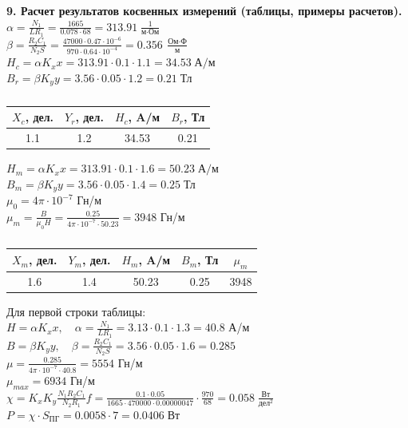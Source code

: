\documentclass[12pt,fleqn]{article}
\begin{document}
\begin{justify}
    \textbf{9. Расчет результатов косвенных измерений (таблицы, примеры расчетов).} \\
    $ \alpha = \frac{N_1}{LR_1} = \frac{1665}{0.078 \cdot 68} = 313.91 \; \frac{1}{\text{м} \cdot \text{Ом}} $ \\
    $ \beta = \frac{R_2C_1}{N_2S} = \frac{47000 \cdot 0.47 \cdot 10^{-6}}{970 \cdot 0.64 \cdot 10^{-4}} = 0.356 \; \frac{\text{Ом} \cdot \text{Ф}}{\text{м}} $ \\
    $ H_c = \alpha K_x x = 313.91 \cdot 0.1 \cdot 1.1 = 34.53 \; \text{А/м}$ \\
    $ B_r = \beta K_y y = 3.56 \cdot 0.05 \cdot 1.2 = 0.21 \; \text{Тл} $ \\
    \begin{table}[h]
    \centering
    \caption{}
    \renewcommand{\arraystretch}{1.5}
    \begin{tabular}{|c|c|c|c|}
        \hline
        $X_c$, дел. & $Y_r$, дел. & $H_c$, A/м & $B_r$, Тл \\
        \hline
        1.1 & 1.2 & 34.53 & 0.21 \\
        \hline
    \end{tabular}
    \end{table}
    $ H_m = \alpha K_x x = 313.91 \cdot 0.1 \cdot 1.6 = 50.23 \; \text{А/м}$ \\
    $ B_m = \beta K_y y = 3.56 \cdot 0.05 \cdot 1.4 = 0.25 \; \text{Тл} $ \\
    $ \mu_0 = 4\pi \cdot 10^{-7}$ Гн/м\\
    $ \mu_m = \frac{B}{\mu_0 H} = \frac{0.25}{4\pi \cdot 10^{-7} \cdot 50.23} = 3948 $ Гн/м \\
    \begin{table}[h]
    \centering
    \caption{}
    \renewcommand{\arraystretch}{1.5}
    \begin{tabular}{|c|c|c|c|c|}
        \hline
        $X_m$, дел. & $Y_m$, дел. & $H_m$, A/м & $B_m$, Тл & $ \mu_m $  \\
        \hline
        1.6 & 1.4 & 50.23 & 0.25 & 3948 \\
        \hline
    \end{tabular}
    \end{table}

    Для первой строки таблицы: \\
    $ H = \alpha K_x x, \quad \alpha = \frac{N_1}{L R_1} = 3.13 \cdot 0.1 \cdot 1.3 = 40.8 $ А/м\\
    $ B = \beta K_y y, \quad \beta = \frac{R_2 C_1}{N_2 S} = 3.56 \cdot 0.05 \cdot 1.6 = 0.285 $ \\
    $ \mu = \frac{0.285}{4\pi \cdot 10^{-7} \cdot 40.8} = 5554 $ Гн/м \\
    $ \mu_{max} = 6934 $ Гн/м \\
    $ \chi = K_x K_y \frac{N_1 R_2 C_1}{N_2 R_1} f = \frac{0.1 \cdot 0.05}{1665 \cdot 470000 \cdot 0.00000047} \cdot \frac{970}{68} = 0.058 \; \frac{\text{Вт}}{\text{дел}^2} $ \\
    $ P = \chi \cdot S_{\text{ПГ}} = 0.0058 \cdot 7 = 0.0406 \; \text{Вт} $ \\


\end{justify}
\end{document}
